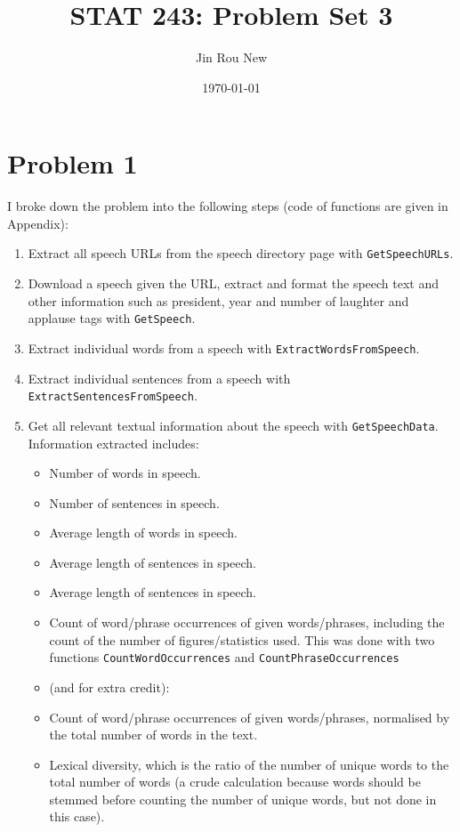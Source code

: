 \documentclass{article}\usepackage[]{graphicx}\usepackage[]{color}
\title{STAT 243: Problem Set 3}
\author{Jin Rou New}
\date{\today}
\begin{document}
\maketitle

\section{Problem 1}

I broke down the problem into the following steps (code of functions are given in Appendix):
\begin{enumerate}

\item Extract all speech URLs from the speech directory page with \texttt{GetSpeechURLs}.
\item Download a speech given the URL, extract and format the speech text and other information such as president, year and number of laughter and applause tags with \texttt{GetSpeech}.
\item Extract individual words from a speech with \texttt{ExtractWordsFromSpeech}.
\item Extract individual sentences from a speech with \texttt{ExtractSentencesFromSpeech}.
\item Get all relevant textual information about the speech with \texttt{GetSpeechData}. Information extracted includes:
  \begin{itemize}
  \item Number of words in speech.
  \item Number of sentences in speech.
  \item Average length of words in speech.
  \item Average length of sentences in speech.
  \item Average length of sentences in speech.
  \item Count of word/phrase occurrences of given words/phrases, including the count of the number of figures/statistics used. This was done with two functions \texttt{CountWordOccurrences} and \texttt{CountPhraseOccurrences}
  \item (and for extra credit):
  \item Count of word/phrase occurrences of given words/phrases, normalised by the total number of words in the text.
  \item Lexical diversity, which is the ratio of the number of unique words to the total number of words (a crude calculation because words should be stemmed before counting the number of unique words, but not done in this case).

\end{itemize}
\end{enumerate}
\end{document}
